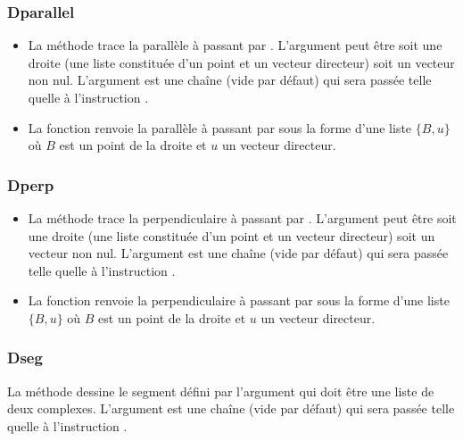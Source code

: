 \subsubsection{Dparallel}
\begin{itemize}
    \item La méthode  trace la parallèle à  passant par . L'argument  peut être soit une droite (une liste constituée d'un point et un vecteur directeur) soit un vecteur non nul. L'argument  est une chaîne (vide par défaut) qui sera passée telle quelle à l'instruction \drawcmd. \arguScale
    \item La fonction  renvoie la parallèle à  passant par  sous la forme d'une liste $\{B,u\}$ où $B$ est un point de la droite et $u$ un vecteur directeur.
\end{itemize}

\subsubsection{Dperp}
\begin{itemize}
    \item La méthode  trace la perpendiculaire à  passant par . L'argument  peut être soit une droite (une liste constituée d'un point et un vecteur directeur) soit un vecteur non nul. L'argument  est une chaîne (vide par défaut) qui sera passée  telle quelle à l'instruction \drawcmd. \arguScale
    \item La fonction  renvoie la perpendiculaire à  passant par  sous la forme d'une liste $\{B,u\}$ où $B$ est un point de la droite et $u$ un vecteur directeur.
\end{itemize}

\subsubsection{Dseg}
La méthode  dessine le segment défini par l'argument  qui doit être une liste de deux complexes. L'argument  est une chaîne (vide par défaut) qui sera passée telle quelle à l'instruction \drawcmd. \arguScale

